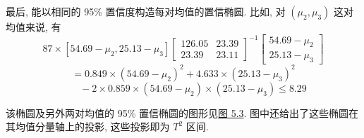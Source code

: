 最后, 能以相同的 95\% 置信度构造每对均值的置信椭圆. 比如, 对 $(\mu_{2},\mu_{3})$ 这对均值来说, 有
\[
87\times[54.69-\mu_{2}, 25.13-\mu_{3}]\begin{bmatrix}126.05&23.39\\23.39&23.11\end{bmatrix}^{-1}\begin{bmatrix}54.69-\mu_{2}\\25.13-\mu_{3}\end{bmatrix}
\]
\[
=0.849\times(54.69-\mu_{2})^{2}+4.633\times(25.13-\mu_{3})^{2}
\]
\[
\qquad -2\times0.859\times(54.69-\mu_{2})\times(25.13-\mu_{3})\le 8.29
\]

该椭圆及另外两对均值的 95\% 置信椭圆的图形见\hyperref[fig:5.3]{图 5.3}. 图中还给出了这些椭圆在其均值分量轴上的投影, 这些投影即为 $T^{2}$ 区间.
